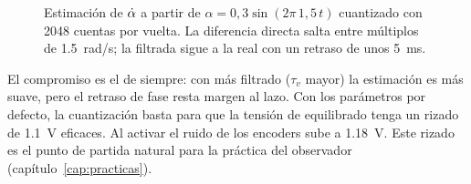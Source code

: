 \begin{figure}[H]
\centering
{}
\caption{Estimación de $\dot{\alpha}$ a partir de $\alpha=0{,}3\sin(2\pi\,1{,}5\,t)$ cuantizado con 2048 cuentas por vuelta. La diferencia directa salta entre múltiplos de \SI{1.5}{rad/s}; la filtrada sigue a la real con un retraso de unos \SI{5}{ms}.}
\label{fig:velest}
\end{figure}

El compromiso es el de siempre: con más filtrado ($\tau_v$ mayor) la estimación es más suave, pero el retraso de fase resta margen al lazo. Con los parámetros por defecto, la cuantización basta para que la tensión de equilibrado tenga un rizado de \SI{1.1}{V} eficaces. Al activar el ruido de los encoders sube a \SI{1.18}{V}. Este rizado es el punto de partida natural para la práctica del observador (capítulo~\ref{cap:practicas}).
